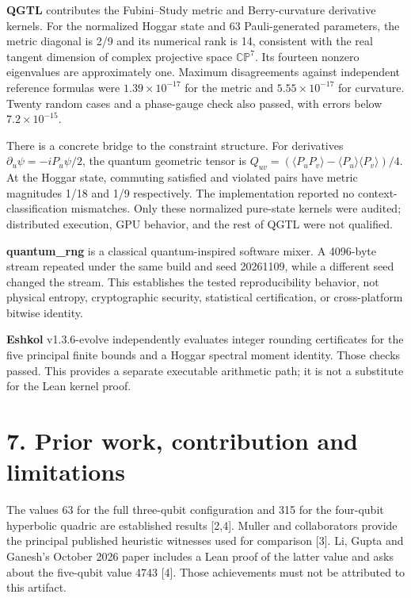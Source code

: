 \documentclass[11pt,letterpaper]{article}
\begin{document}
\textbf{QGTL} contributes the Fubini--Study metric and Berry-curvature derivative kernels. For the normalized Hoggar state and 63 Pauli-generated parameters, the metric diagonal is 2/9 and its numerical rank is 14, consistent with the real tangent dimension of complex projective space \(\mathbb{CP}^7\). Its fourteen nonzero eigenvalues are approximately one. Maximum disagreements against independent reference formulas were \(1.39\times10^{-17}\) for the metric and \(5.55\times10^{-17}\) for curvature. Twenty random cases and a phase-gauge check also passed, with errors below \(7.2\times10^{-15}\).

There is a concrete bridge to the constraint structure. For derivatives \(\partial_u\psi=-iP_u\psi/2\), the quantum geometric tensor is \(Q_{uv}=(\langle P_uP_v\rangle-\langle P_u\rangle\langle P_v\rangle)/4\). At the Hoggar state, commuting satisfied and violated pairs have metric magnitudes 1/18 and 1/9 respectively. The implementation reported no context-classification mismatches. Only these normalized pure-state kernels were audited; distributed execution, GPU behavior, and the rest of QGTL were not qualified.

\textbf{quantum\_rng} is a classical quantum-inspired software mixer. A 4096-byte stream repeated under the same build and seed 20261109, while a different seed changed the stream. This establishes the tested reproducibility behavior, not physical entropy, cryptographic security, statistical certification, or cross-platform bitwise identity.

\textbf{Eshkol} v1.3.6-evolve independently evaluates integer rounding certificates for the five principal finite bounds and a Hoggar spectral moment identity. Those checks passed. This provides a separate executable arithmetic path; it is not a substitute for the Lean kernel proof.

\section{7. Prior work, contribution and limitations}\label{prior-work-contribution-and-limitations}

The values 63 for the full three-qubit configuration and 315 for the four-qubit hyperbolic quadric are established results {[}2,4{]}. Muller and collaborators provide the principal published heuristic witnesses used for comparison {[}3{]}. Li, Gupta and Ganesh's October 2026 paper includes a Lean proof of the latter value and asks about the five-qubit value 4743 {[}4{]}. Those achievements must not be attributed to this artifact.
\end{document}

